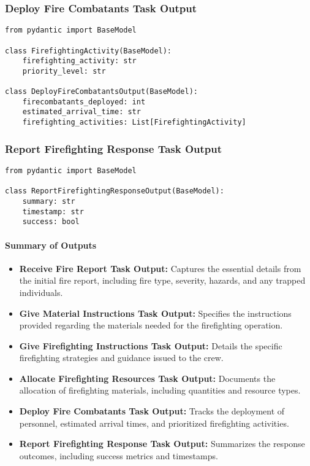 \subsubsection{Deploy Fire Combatants Task Output}
\begin{lstlisting}[caption={Pydantic model for Deploy Fire Combatants Task Output}]
from pydantic import BaseModel

class FirefightingActivity(BaseModel):
    firefighting_activity: str
    priority_level: str

class DeployFireCombatantsOutput(BaseModel):
    firecombatants_deployed: int
    estimated_arrival_time: str
    firefighting_activities: List[FirefightingActivity]
\end{lstlisting}


\subsubsection{Report Firefighting Response Task Output}
\begin{lstlisting}[caption={Pydantic model for Report Firefighting Response Task Output}]
from pydantic import BaseModel

class ReportFirefightingResponseOutput(BaseModel):
    summary: str
    timestamp: str
    success: bool
\end{lstlisting}

\paragraph{Summary of Outputs}
\begin{itemize}
\item \textbf{Receive Fire Report Task Output:} Captures the essential details from the initial fire report, including fire type, severity, hazards, and any trapped individuals.
\item \textbf{Give Material Instructions Task Output:} Specifies the instructions provided regarding the materials needed for the firefighting operation.
\item \textbf{Give Firefighting Instructions Task Output:} Details the specific firefighting strategies and guidance issued to the crew.
\item \textbf{Allocate Firefighting Resources Task Output:} Documents the allocation of firefighting materials, including quantities and resource types.
\item \textbf{Deploy Fire Combatants Task Output:} Tracks the deployment of personnel, estimated arrival times, and prioritized firefighting activities.
\item \textbf{Report Firefighting Response Task Output:} Summarizes the response outcomes, including success metrics and timestamps.
\end{itemize}


